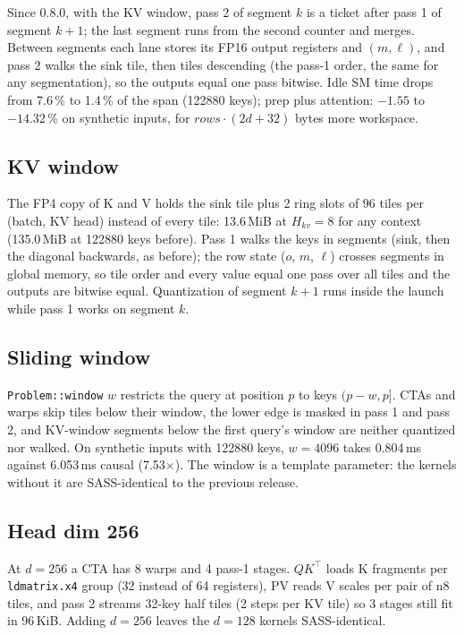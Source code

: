 \documentclass[10pt,twocolumn]{article}
\newcommand{\code}[1]{\texttt{#1}}
\begin{document}
Since 0.8.0, with the KV window, pass 2 of segment $k$ is a ticket after pass 1 of segment $k+1$; the last
segment runs from the second counter and merges. Between segments each lane stores its FP16 output registers
and $(m, \ell)$, and pass 2 walks the sink tile, then tiles descending (the pass-1 order, the same for any
segmentation), so the outputs equal one pass bitwise. Idle SM time drops from 7.6\,\% to 1.4\,\% of the span
(122880 keys); prep plus attention: $-1.55$ to $-14.32$\,\% on synthetic inputs, for $\mathit{rows}\cdot(2d+32)$
bytes more workspace.

\subsection{KV window}

The FP4 copy of K and V holds the sink tile plus 2 ring slots of 96 tiles per (batch, KV head) instead of
every tile: 13.6\,MiB at $H_{kv}=8$ for any context (135.0\,MiB at 122880 keys before). Pass 1 walks the keys
in segments (sink, then the diagonal backwards, as before); the row state ($o$, $m$, $\ell$) crosses segments
in global memory, so tile order and every value equal one pass over all tiles and the outputs are bitwise
equal. Quantization of segment $k+1$ runs inside the launch while pass 1 works on segment $k$.

\subsection{Sliding window}

\code{Problem::window} $w$ restricts the query at position $p$ to keys $(p-w, p]$. CTAs and warps skip tiles
below their window, the lower edge is masked in pass 1 and pass 2, and KV-window segments below the first
query's window are neither quantized nor walked. On synthetic inputs with 122880 keys, $w=4096$ takes
0.804\,ms against 6.053\,ms causal (7.53$\times$). The window is a template parameter: the kernels without it are
SASS-identical to the previous release.

\subsection{Head dim 256}

At $d=256$ a CTA has 8 warps and 4 pass-1 stages. $QK^\top$ loads K fragments per \code{ldmatrix.x4} group
(32 instead of 64 registers), PV reads V scales per pair of n8 tiles, and pass 2 streams 32-key half tiles
(2 steps per KV tile) so 3 stages still fit in 96\,KiB. Adding $d=256$ leaves the $d=128$ kernels SASS-identical.
\end{document}
